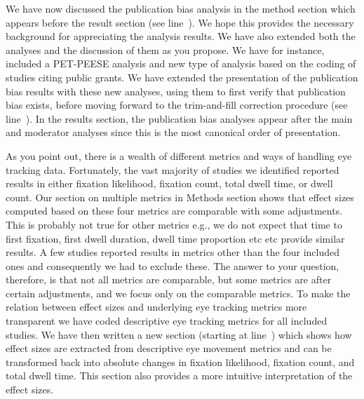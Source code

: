 We have now discussed the publication bias analysis in the method section which appears before the result section (see line~). We hope this provides the necessary background for appreciating the analysis results. We have also extended both the analyses and the discussion of them as you propose. We have for instance, included a PET-PEESE analysis and new type of analysis based on the coding of studies citing public grants. We have extended the presentation of the publication bias results with these new analyses, using them to first verify that publication bias exists, before moving forward to the trim-and-fill correction procedure (see line~). In the results section, the publication bias analyses appear after the main and moderator analyses since this is the most canonical order of presentation.



As you point out, there is a wealth of different metrics and ways of handling eye tracking data. Fortunately, the vast majority of studies we identified reported results in either fixation likelihood, fixation count, total dwell time, or dwell count. Our section on multiple metrics in Methods section shows that effect sizes computed based on these four metrics are comparable with some adjustments. This is probably not true for other metrics e.g., we do not expect that time to first fixation, first dwell duration, dwell time proportion etc etc provide similar results. A few studies reported results in metrics other than the four included ones and consequently we had to exclude these. The answer to your question, therefore, is that not all metrics are comparable, but some metrics are after certain adjustments, and we focus only on the comparable metrics. To make the relation between effect sizes and underlying eye tracking metrics more transparent we have coded descriptive eye tracking metrics for all included studies. We have then written a new section (starting at line~) which shows how effect sizes are extracted from descriptive eye movement metrics and can be transformed back into absolute changes in fixation likelihood, fixation count, and total dwell time. This section also provides a more intuitive interpretation of the effect sizes. 


